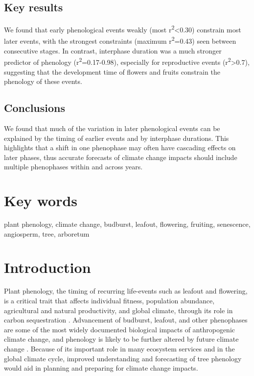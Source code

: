 \documentclass{article}
\begin{document}
\subsection*{Key results}
We found that early phenological events weakly (most r\textsuperscript{2}<0.30) constrain most later events, with the strongest constraints (maximum r\textsuperscript{2}=0.43) seen between consecutive stages. In contrast, interphase duration was a much stronger predictor of phenology (r\textsuperscript{2}=0.17-0.98), especially for reproductive events (r\textsuperscript{2}>0.7), suggesting that the development time of flowers and fruits constrain the phenology of these events.
\subsection*{Conclusions}
We found that much of the variation in later phenological events can be explained by the timing of earlier events and by interphase durations. This highlights that a shift in one phenophase may often have cascading effects on later phases, thus accurate forecasts of climate change impacts should include multiple phenophases within and across years. %

\section* {Key words}
plant phenology, climate change, budburst, leafout, flowering, fruiting, senescence, angiosperm, tree, arboretum
\section* {Introduction}
Plant phenology, the timing of recurring life-events such as leafout and flowering, is a critical trait that affects individual fitness, population abundance, agricultural and natural productivity, and global climate, through its role in carbon sequestration \citep{chuine2001,cleland2007,willis2010,miller-rushing2010,craine2012}. Advancement of budburst, leafout, and other phenophases are some of the most widely documented biological impacts of anthropogenic climate change, and phenology is likely to be further altered by future climate change \citep{parmesan2006}. Because of its important role in many ecosystem services and in the global climate cycle, improved understanding and forecasting of tree phenology would aid in planning and preparing for climate change impacts.
\end{document}

